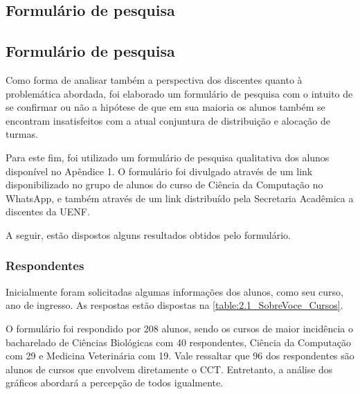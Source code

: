 \begin{apendicesenv} %

  \chapter*{Formulário de pesquisa}

  \section{Formulário de pesquisa} %


  Como forma de analisar também a perspectiva dos discentes quanto à problemática abordada, foi elaborado um formulário de pesquisa com o intuito de se confirmar ou não a hipótese de que em sua maioria os alunos também se encontram insatisfeitos com a atual conjuntura de distribuição e alocação de turmas.

  Para este fim, foi utilizado um formulário de pesquisa qualitativa dos alunos disponível no Apêndice 1. O formulário foi divulgado através de um link disponibilizado no grupo de alunos do curso de Ciência da Computação no WhatsApp, e também através de um link distribuído pela Secretaria Acadêmica a discentes da UENF.

  A seguir, estão dispostos alguns resultados obtidos pelo formulário.

  \subsection{Respondentes} %

  Inicialmente foram solicitadas algumas informações dos alunos, como seu curso, ano de ingresso. As respostas estão dispostas na \autoref{table:2.1_SobreVoce_Cursos}.


  O formulário foi respondido por 208 alunos, sendo os cursos de maior incidência o bacharelado de Ciências Biológicas com 40 respondentes, Ciência da Computação com 29 e Medicina Veterinária com 19. Vale ressaltar que 96 dos respondentes são alunos de cursos que envolvem diretamente o CCT. Entretanto, a análise dos gráficos abordará a percepção de todos igualmente.


\end{apendicesenv}
